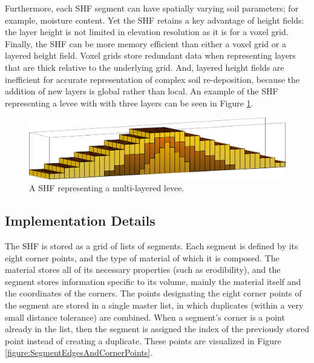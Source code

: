 Furthermore, each SHF segment can have spatially varying soil parameters; for example, moisture content. Yet the SHF retains a key advantage of height fields: the layer height is not limited in elevation resolution as it is for a voxel grid. Finally, the SHF can be more memory efficient than either a voxel grid or a layered height field. Voxel grids store redundant data when representing layers that are thick relative to the underlying grid. And, layered height fields are inefficient for accurate representation of complex soil re-deposition, because the addition of new layers is global rather than local. An example of the SHF representing a levee with with three layers can be seen in Figure \ref{figure:SHFDrawn}.

\begin{figure}[t]
\begin{minipage}[b]{0.9\linewidth}
\begin{center}
\includegraphics[width=\textwidth]{images/SHF.pdf}
\end{center}
\end{minipage}
\caption[Multi-layered levee-shaped SHF]
{\label{figure:SHFDrawn} A SHF representing a multi-layered levee.}
\end{figure}



\subsection{Implementation Details}

The SHF is stored as a grid of lists of segments. Each segment is defined by its eight corner points, and the type of material of which it is composed. The material stores all of its necessary properties (such as erodibility), and the segment 
stores information specific to its volume, mainly the material itself and the coordinates of the corners.
The points designating the eight corner points of the segment are stored in a single master list, in which duplicates (within a very small distance tolerance) are combined. When a segment's corner is a point already in the list, then the segment is assigned the index of the previously stored point instead of creating a duplicate. These points are visualized in Figure \ref{figure:SegmentEdgesAndCornerPoints}.

